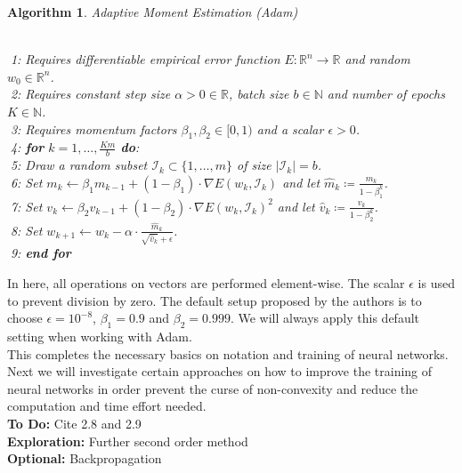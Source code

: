 \documentclass[11pt, a4paper]{article}
\newtheorem{algorithm}[theorem]{Algorithm}
\newcommand{\N}{\mathbb{N}}
\newcommand{\R}{\mathbb{R}}
\newcommand{\I}{\mathcal{I}}
\begin{document}
\begin{algorithm}
\caption{Adaptive Moment Estimation (Adam)} \ \\
\textcolor{white}{$\Big |$}1: Requires differentiable empirical error function $E: \R^n \to \R$ and random $w_0 \in \R^n$.  \\
\textcolor{white}{$\Big |$}2: Requires constant step size $\alpha > 0 \in \R$, batch size $b \in \N$ and number of epochs $K \in \N$. \\
\textcolor{white}{$\Big |$}3: Requires momentum factors $\beta_1, \beta_2 \in [0,1)$ and a scalar $\epsilon > 0$. \\
\textcolor{white}{$\Big |$}4: \textbf{for} $k=1, \dots, \frac{Km}{b}$ \textbf{do}: \\
\textcolor{white}{$\Big |$}5: \quad Draw a random subset $\I_k \subset \{1, \dots, m \}$ of size $| \I_k | = b$. \\
\textcolor{white}{$\Big |$}6: \quad Set $m_{k} \leftarrow \beta_1 m_{k-1} + (1-\beta_1) \cdot \nabla E(w_k,\I_k)$ and let $\hat{m}_k \coloneq \frac{m_k}{1-\beta_1^k}$. \\
\textcolor{white}{$\Big |$}7: \quad Set $v_{k} \leftarrow \beta_2 v_{k-1} + (1-\beta_2) \cdot \nabla E(w_k,\I_k)^2$ and let $\hat{v}_k \coloneq \frac{v_k}{1-\beta_2^k}$. \\
\textcolor{white}{$\Big |$}8: \quad Set $w_{k+1} \leftarrow w_k - \alpha \cdot \frac{\hat{m}_k}{\sqrt{\hat{v}_k} + \epsilon}$. \\
\textcolor{white}{$\Big |$}9: \textbf{end for}
\end{algorithm}

In here, all operations on vectors are performed element-wise. The scalar $\epsilon$ is used to prevent division by zero. The default setup proposed by the authors is to choose $\epsilon = 10^{-8}$, $\beta_1 = 0.9$ and $\beta_2 = 0.999$. We will always apply this default setting when working with Adam. \\

This completes the necessary basics on notation and training of neural networks. Next we will investigate certain approaches on how to improve the training of neural networks in order prevent the curse of non-convexity and reduce the computation and time effort needed.  \\

\textbf{To Do:} Cite 2.8 and 2.9 \\
\textbf{Exploration:} Further second order method \\
\textbf{Optional:} Backpropagation
\end{document}
